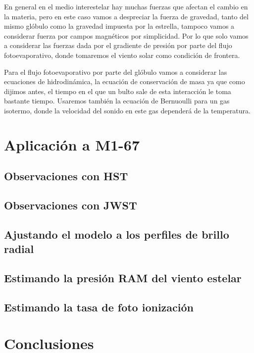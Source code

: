 \documentclass{book}
\begin{document}
En general en el medio interestelar hay muchas fuerzas que afectan el cambio en la materia, pero en este caso vamos a despreciar la fuerza de gravedad, tanto del mismo glóbulo como la gravedad impuesta por la estrella, tampoco vamos a considerar fuerza por campos magnéticos por simplicidad. Por lo que solo vamos a considerar las fuerzas dada por el gradiente de presión por parte del flujo fotoevaporativo, donde tomaremos el viento solar como condición de frontera.

Para el flujo fotoevaporativo por parte del glóbulo vamos a considerar las ecuaciones de hidrodinámica, la ecuación de conservación de masa ya que como dijimos antes, el tiempo en el que un bulto sale de esta interacción le toma bastante tiempo. Usaremos también la ecuación de Bernuoulli para un gas isotermo, donde la velocidad del sonido en este gas dependerá de la temperatura.

\chapter{Aplicación a M1-67}

\section{Observaciones con HST}

\section{Observaciones con JWST}

\section{Ajustando el modelo a los perfiles de brillo radial}

\section{Estimando la presión RAM del viento estelar}

\section{Estimando la tasa de foto ionización}

\chapter{Conclusiones}
\end{document}
